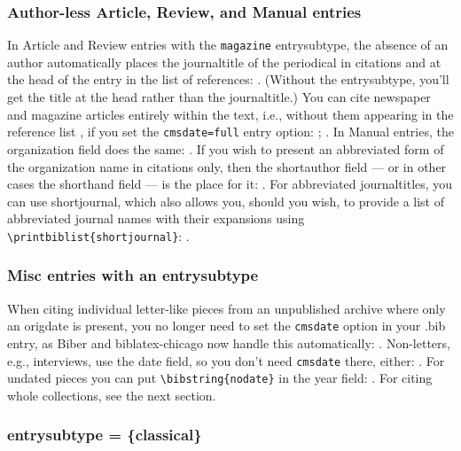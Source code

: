 \documentclass[a4paper,12pt]{report}
\newcommand{\cmd}[1]{\texttt{\textbackslash #1}}
\begin{document}
\subsubsection*{Author-less Article, Review, and Manual entries}
\label{sec:authless:art}

In \textsf{Article} and \textsf{Review} entries with the
\texttt{magazine} entrysubtype, the absence of an author automatically
places the \textsf{journaltitle} of the periodical in citations and at
the head of the entry in the list of references:
\autocite{gourmet:052006}.  (Without the entrysubtype, you'll get the
\textsf{title} at the head rather than the \textsf{journaltitle}.)
You can cite newspaper and magazine articles entirely within the text,
i.e., without them appearing in the reference list
\autocite[15.47]{chicago:manual}, if you set the \texttt{cmsdate=full}
entry option: \autocite{lakeforester:pushcarts};
\autocite{nyt:trevorobit}.  In \textsf{Manual} entries, the
\textsf{organization} field does the same: \autocite{dyna:browser}.
If you wish to present an abbreviated form of the organization name in
citations only, then the \textsf{shortauthor} field --- or in other
cases the \textsf{shorthand} field --- is the place for it:
\autocite{bsi:abbreviation}.  For abbreviated \textsf{journaltitles},
you can use \textsf{shortjournal}, which also allows you, should you
wish, to provide a list of abbreviated journal names with their
expansions using \cmd{printbiblist\{shortjournal\}}:
\autocite{unsigned:ranke}.

\subsubsection*{Misc entries with an entrysubtype}
\label{sec:misc}

When citing individual letter-like pieces from an unpublished archive
where only an \textsf{origdate} is present, you no longer need to set
the \texttt{cmsdate} option in your .bib entry, as \textsf{Biber} and
\textsf{biblatex-chicago} now handle this automatically:
\autocite{creel:house}.  Non-letters, e.g., interviews, use the
\textsf{date} field, so you don't need \texttt{cmsdate} there, either:
\autocite{spock:interview}.  For undated pieces you can put
\cmd{bibstring\{nodate\}} in the \textsf{year} field:
\autocite{dinkel:agassiz}.  For citing whole collections, see the next
section.

\subsubsection*{entrysubtype = \{classical\}}
\label{sec:classical}
\end{document}
